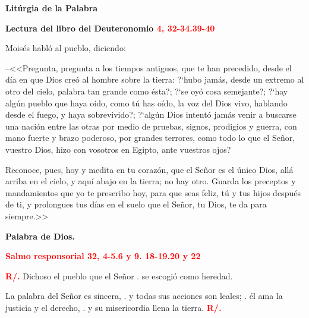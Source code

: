 \documentclass[12pt, letterpaper, spanish]{report}
\begin{document}
\newpage

\begin{center} 
\Huge {\bfseries Lit\'urgia de la Palabra}
\end{center}

\Large {\bfseries Lectura del libro del Deuteronomio \hspace{1cm} \textcolor{red}{4, 32-34.39-40}} \newline

\Large Mois\'es habl\'o al pueblo, diciendo: \newline

--<<Pregunta, pregunta a los tiempos antiguos, que te han precedido, desde el d\'ia en que Dios 
cre\'o al hombre sobre la tierra: ?`hubo jam\'as, desde un extremo al otro del cielo, palabra tan 
grande como \'esta?; ?`se oy\'o cosa semejante?; ?`hay alg\'un pueblo que haya o\'ido, como t\'u has 
o\'ido, la voz del Dios vivo, hablando desde el fuego, y haya sobrevivido?; ?`alg\'un Dios intent\'o 
jam\'as venir a buscarse una naci\'on entre las otras por medio de pruebas, signos, prodigios y 
guerra, con mano fuerte y brazo poderoso, por grandes terrores, como todo lo que el Se\~nor, vuestro 
Dios, hizo con vosotros en Egipto, ante vuestros ojos? \newline

Reconoce, pues, hoy y medita en tu coraz\'on, que el Se\~nor es el \'unico Dios, all\'a arriba en el 
cielo, y aqu\'i abajo en la tierra; no hay otro. Guarda los preceptos y mandamientos que yo te 
prescribo hoy, para que seas feliz, t\'u y tus hijos despu\'es de ti, y prolongues tus d\'ias en el 
suelo que el Se\~nor, tu Dios, te da para siempre.>> \newline

{\bfseries Palabra de Dios.} \newline

\newpage

\Large {\bfseries \textcolor{red}{Salmo responsorial \hspace{1cm} 32, 4-5.6 y 9. 18-19.20 y 22}} \newline

\Large {\bfseries \textcolor{red}{R/.}} \hspace{1cm} Dichoso el pueblo que el Se\~nor \newline
. \hspace{3cm} se escogi\'o como heredad. \newline

\hspace{2cm} La palabra del Se\~nor es sincera, \newline
. \hspace{2.5cm} y todas sus acciones son leales; \newline
. \hspace{2.5cm} \'el ama la justicia y el derecho, \newline
. \hspace{2.5cm} y su misericordia llena la tierra. \hspace{1cm} {\bfseries \textcolor{red}{R/.}} \newline
\end{document}
